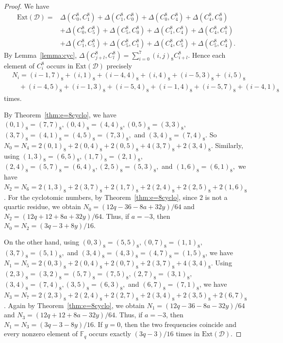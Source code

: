 \documentclass[12pt, a4paper]{article}
\theoremstyle{definition}
\begin{document}
\begin{proof}
	We have
	\[
	\begin{aligned}
		\mathrm{Ext}(\mathcal D)
		={}&
		\Delta(C_0^8,C_1^8)+\Delta(C_1^8,C_0^8)
		+\Delta(C_0^8,C_4^8)+\Delta(C_4^8,C_0^8)\\
		&+\Delta(C_0^8,C_5^8)+\Delta(C_5^8,C_0^8)
		+\Delta(C_1^8,C_4^8)+\Delta(C_4^8,C_1^8)\\
		&+\Delta(C_1^8,C_5^8)+\Delta(C_5^8,C_1^8)
		+\Delta(C_4^8,C_5^8)+\Delta(C_5^8,C_4^8).
	\end{aligned}
	\]
	By Lemma~\ref{lemma:cyc},
	$
	\Delta(C_{j+l}^8,C_l^8)
	=
	\sum_{i=0}^7(i,j)_8C_{i+l}^8.
	$
	Hence each element of $C_i^8$ occurs in $\mathrm{Ext}(\mathcal D)$ precisely
	\[
	\begin{aligned}
		&N_i=(i-1,7)_8+(i,1)_8+(i-4,4)_8
		+(i,4)_8+(i-5,3)_8+(i,5)_8\\
		&\quad +(i-4,5)_8+(i-1,3)_8+(i-5,4)_8
		+(i-1,4)_8+(i-5,7)_8+(i-4,1)_8
	\end{aligned}
	\]
	times.
	
	By Theorem~\ref{thm:e=8cyclo}, we have
	$
	(0,1)_8=(7,7)_8,
	(0,4)_8=(4,4)_8,
	(0,5)_8=(3,3)_8,
	$
	$
	(3,7)_8=(4,1)_8=(4,5)_8=(7,3)_8,
	$
	and
	$
	(3,4)_8=(7,4)_8$.
	So $N_0=N_4=
	2(0,1)_8+2(0,4)_8+2(0,5)_8
	+4(3,7)_8+2(3,4)_8.
	$
	Similarly, using
	$
	(1,3)_8=(6,5)_8,
	(1,7)_8=(2,1)_8,
	$
	$
	(2,4)_8=(5,7)_8=(6,4)_8,
	(2,5)_8=(5,3)_8,
	$
	and
	$
	(1,6)_8=(6,1)_8,
	$
	we have
	$
	N_2=N_6=
	2(1,3)_8+2(3,7)_8+2(1,7)_8
	+2(2,4)_8+2(2,5)_8+2(1,6)_8
	$.
	For the cyclotomic numbers, by Theorem~\ref{thm:e=8cyclo}, since $2$
	is not a quartic residue, we obtain
	$
	N_0=(12q-36-8a+32y)/64
	$
	and
	$
	N_2=(12q+12+8a+32y)/64.
	$
	Thus, if $a=-3$, then
	$
	N_0=N_2=(3q-3+8y)/16.
	$
	
	On the other hand, using
	$
	(0,3)_8=(5,5)_8,
	(0,7)_8=(1,1)_8,
	$
	$
	(3,7)_8=(5,1)_8,
	$
	and
	$
	(3,4)_8=(4,3)_8=(4,7)_8=(1,5)_8$,
	we have
    $N_1=N_5=
	2(0,3)_8+2(0,4)_8+2(0,7)_8
	+2(3,7)_8+4(3,4)_8
	$.
	Using
	$
	(2,3)_8=(3,2)_8=(5,7)_8=(7,5)_8,
	(2,7)_8=(3,1)_8,
	$
	$
	(3,4)_8=(7,4)_8,
	(3,5)_8=(6,3)_8,
	$
	and
	$
	(6,7)_8=(7,1)_8$,
    we have 
	$N_3=N_7=
	2(2,3)_8+2(2,4)_8+2(2,7)_8
	+2(3,4)_8+2(3,5)_8+2(6,7)_8
	$.
	Again by Theorem~\ref{thm:e=8cyclo}, we obtain
	$
	N_1=(12q-36-8a-32y)/64
	$
	and
	$
	N_3=(12q+12+8a-32y)/64.
	$
	Thus, if $a=-3$, then
	$
	N_1=N_3=(3q-3-8y)/16$.
If $y=0$, then the two frequencies coincide and every nonzero element of $\mathbb F_q$ occurs exactly
$(3q-3)/16$ times in $\mathrm{Ext}(\mathcal D)$. 
\end{proof}
\end{document}
